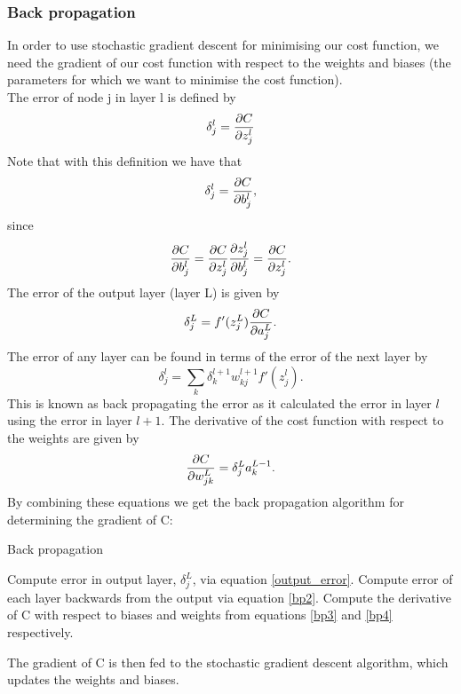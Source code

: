 \documentclass[notitlepage, reprint, nofootinbib]{revtex4-1}
\begin{document}
\subsubsection{Back propagation}
In order to use stochastic gradient descent for minimising our cost function, we need the gradient of our cost function with respect to the weights and biases (the parameters for which we want to minimise the cost function). \\[2mm]
The error of node j in layer l is defined by \cite[chpt 2]{nielsen} 
\begin{equation}\label{error}\delta_j^l=\pdv{C}{z_j^l}\end{equation}
Note that with this definition we have that
\begin{equation}\label{bp3}\delta_j^l = \pdv{C}{b_j^l},\end{equation}
since
$$ \pdv{C}{b_j^l}=\pdv{C}{z_j^l}\pdv{z_j^l}{b_j^l}=\pdv{C}{z_j^l}.$$
The error of the output layer (layer L) is given by 
\begin{equation}\label{output_error}\delta_j^L=f'(z_j^L)\pdv{C}{a_j^L}.\end{equation}
The error of any layer can be found in terms of the error of the next layer by 
\begin{equation}\label{bp2}\delta_j^l=\sum_k \delta_k^{l+1}w_{kj}^{l+1}f'(z_j^l).\end{equation}
This is known as back propagating the error as it calculated the error in layer $l$ using the error in layer $l+1$. The derivative of the cost function with respect to the weights are given by
\begin{equation}\label{bp4}\pdv{C}{w_{jk}^L}=\delta_j^L a_k^{L-1}.\end{equation}
By combining these equations we get the back propagation algorithm for determining the gradient of C: 
\begin{algorithm}[H]
	\caption{Back propagation}
	\begin{algorithmic}[1]
		\State Compute error in output layer, $\delta_j^L$, via equation \ref{output_error}.
		\State Compute error of each layer backwards from the output via equation \ref{bp2}.
		\State Compute the derivative of C with respect to biases and weights from equations \ref{bp3} and \ref{bp4} respectively.
	\end{algorithmic}
\end{algorithm}
The gradient of C is then fed to the stochastic gradient descent algorithm, which updates the weights and biases. 
\end{document}
